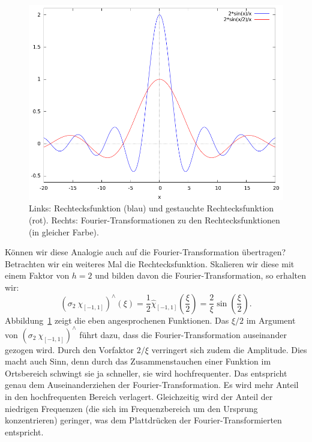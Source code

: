 \begin{remark}
\begin{description}
\begin{figure}[ht]
\begin{minipage}{0.49\linewidth}
            \includegraphics[width=\linewidth]{Bilder/FT_Skalierung_Freq}
          \end{minipage}
          \caption{Links: Rechtecksfunktion (blau) und gestauchte Rechtecksfunktion (rot). 
          Rechts:
            Fourier-Transformationen zu den Rechtecksfunktionen (in gleicher Farbe).}
          \label{fig:FT_Skalierung}
        \end{figure}
    
    Können wir diese Analogie auch auf die Fourier-Transformation übertragen? Betrachten wir ein
    weiteres Mal die Rechtecksfunktion. Skalieren wir diese mit einem Faktor von $ h = 2 $ und 
    bilden davon die Fourier-Transformation, so erhalten wir:
    \[
        (\sigma_{2} \ \chi_{[-1,1]})^{\wedge}(\xi)
      = \frac{1}{2} \widehat{\chi}_{[-1,1]} \left( \frac{\xi}{2} \right) 
      = \frac{2}{\xi} \sin \left( \frac{\xi}{2} \right).
    \]
    Abbildung~\ref{fig:FT_Skalierung} zeigt die eben angesprochenen Funktionen. Das 
    $ \xi /2 $ im Argument von $ (\sigma_{2} \ \chi_{[-1,1]})^{\wedge} $ führt dazu, dass die
    Fourier-Transformation auseinander gezogen wird. Durch den Vorfaktor $ 2 / \xi $ verringert sich
    zudem die Amplitude. Dies macht auch Sinn, denn durch das Zusammenstauchen einer Funktion im
    Ortsbereich schwingt sie ja schneller, sie wird hochfrequenter. Das entspricht genau dem
    Auseinanderziehen der Fourier-Transformation. Es wird mehr Anteil in den hochfrequenten Bereich
    verlagert. Gleichzeitig wird der Anteil der niedrigen Frequenzen (die sich im Frequenzbereich 
    um den Ursprung konzentrieren) geringer, was dem Plattdrücken der Fourier-Transformierten 
    entspricht.
    

\end{description}
\end{remark}
